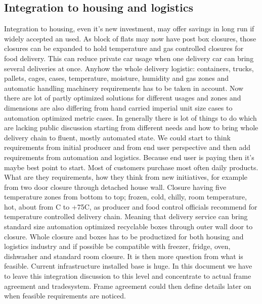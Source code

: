 \subsection{Integration to housing and logistics}
\label{integration}
Integration to housing, even it's new investment, may offer savings in long run if widely accepted an used. As block of flats may now have post box closures, those closures can be expanded to hold temperature and gas controlled closures for food delivery. This can reduce private car usage when one delivery car can bring several deliveries at once. Anyhow the whole delivery logistic: containers, trucks, pallets, cages, cases, temperature, moisture, humidity and gas  zones and automatic handling machinery requirements has to be taken in account. Now there are lot of partly optimized solutions for different usages and zones and dimensions are also differing from hand carried imperial unit size cases to automation optimized metric cases. In generally there is lot of things to do which are lacking public discussion starting from different needs and how to bring whole delivery chain to fluent, mostly automated state. We could start to think requirements from initial producer and from end user perspective and then add requirements from automation and logistics. Because end user is paying then it's maybe best point to start. Most of customers purchase most often daily products. What are they requirements, how they think  from new initiatives, for example from two door closure through detached house wall. Closure having five temperature zones from bottom to top; frozen, cold, chilly, room temperature, hot, about from \textdegree C to +75\textdegree C, as producer and food control officials recommend for temperature controlled delivery chain. Meaning that delivery service can bring standard size automation optimized recyclable boxes through outer wall door to closure. Whole closure and boxes has to be productized for both housing and logistics industry and if possible be compatible with freezer, fridge, oven, dishwasher and standard room closure. It is then more question from what is feasible. Current infrastructure installed base is huge. In this document we have to leave this integration discussion to this level and concentrate to actual frame agreement and tradesystem. Frame agreement could then define details later on when feasible requirements are noticed. 

